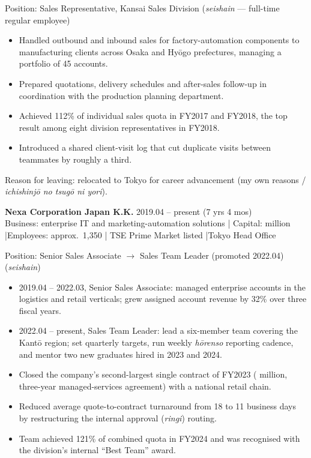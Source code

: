\documentclass[10pt,a4paper]{article}
\newcommand{\jobmeta}[1]{{\footnotesize\color{softgray} #1}}
\begin{document}
\vspace{1pt}
Position: Sales Representative, Kansai Sales Division \quad
\jobmeta{(\textit{seishain} --- full-time regular employee)}
\begin{itemize}
  \item Handled outbound and inbound sales for factory-automation components to
    manufacturing clients across Osaka and Hy\={o}go prefectures, managing a portfolio
    of 45 accounts.
  \item Prepared quotations, delivery schedules and after-sales follow-up in coordination
    with the production planning department.
  \item Achieved 112\% of individual sales quota in FY2017 and FY2018, the top result
    among eight division representatives in FY2018.
  \item Introduced a shared client-visit log that cut duplicate visits between teammates
    by roughly a third.
\end{itemize}
\jobmeta{Reason for leaving: relocated to Tokyo for career advancement (my own reasons /
\textit{ichishinj\={o} no tsug\={o} ni yori}).}

\vspace{3pt}
\textbf{\color{inknavy} Nexa Corporation Japan K.K.} \hfill \jobmeta{2019.04 -- present (7 yrs 4 mos)}\\
\jobmeta{Business: enterprise IT and marketing-automation solutions \quad|\quad
Capital: \textyen 480 million \quad|\quad Employees: approx.\ 1{,}350 \quad|\quad
TSE Prime Market listed \quad|\quad Tokyo Head Office}

\vspace{1pt}
Position: Senior Sales Associate $\rightarrow$ Sales Team Leader (promoted 2022.04) \quad
\jobmeta{(\textit{seishain})}
\begin{itemize}
  \item 2019.04 -- 2022.03, Senior Sales Associate: managed enterprise accounts in the
    logistics and retail verticals; grew assigned account revenue by 32\% over three
    fiscal years.
  \item 2022.04 -- present, Sales Team Leader: lead a six-member team covering the
    Kant\={o} region; set quarterly targets, run weekly \textit{h\={o}renso} reporting
    cadence, and mentor two new graduates hired in 2023 and 2024.
  \item Closed the company's second-largest single contract of FY2023 ( million,
    three-year managed-services agreement) with a national retail chain.
  \item Reduced average quote-to-contract turnaround from 18 to 11 business days by
    restructuring the internal approval (\textit{ringi}) routing.
  \item Team achieved 121\% of combined quota in FY2024 and was recognised with the
    division's internal ``Best Team'' award.
\end{itemize}
\end{document}
